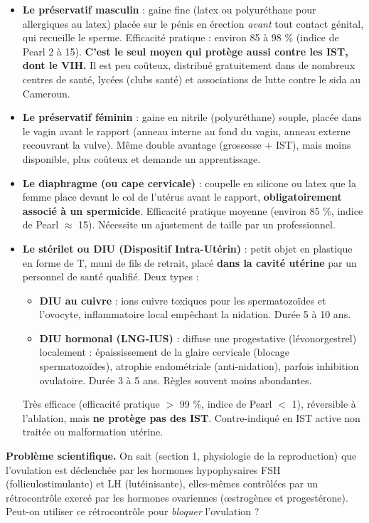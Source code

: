\documentclass[11pt]{article}
\newcommand{\cle}[1]{{\popxbold\color{popdark}#1}}
\newcounter{popsec}
\newcounter{popsub}
\newcommand{\courssub}[1]{%
  \stepcounter{popsub}%
  \par\vspace{9pt}\noindent{\popxbold\fontsize{11.5}{13}\selectfont\color{popink}{\color{poporange}\thepopsec.\thepopsub}\hspace{6pt}#1}\par\nopagebreak\vspace{4pt}
}
\begin{document}
\begin{itemize}
\item \textbf{Le préservatif masculin} : gaine fine (latex ou polyuréthane pour allergiques au latex) placée sur le pénis en érection \emph{avant} tout contact génital, qui recueille le sperme. Efficacité pratique : environ 85 à 98 \% (indice de Pearl 2 à 15). \textbf{C'est le seul moyen qui protège aussi contre les IST, dont le VIH.} Il est peu coûteux, distribué gratuitement dans de nombreux centres de santé, lycées (clubs santé) et associations de lutte contre le sida au Cameroun.
\item \textbf{Le préservatif féminin} : gaine en nitrile (polyuréthane) souple, placée dans le vagin avant le rapport (anneau interne au fond du vagin, anneau externe recouvrant la vulve). Même double avantage (grossesse + IST), mais moins disponible, plus coûteux et demande un apprentissage.
\item \textbf{Le diaphragme (ou cape cervicale)} : coupelle en silicone ou latex que la femme place devant le col de l'utérus avant le rapport, \textbf{obligatoirement associé à un spermicide}. Efficacité pratique moyenne (environ 85 \%, indice de Pearl $\approx$ 15). Nécessite un ajustement de taille par un professionnel.
\item \textbf{Le stérilet ou DIU (Dispositif Intra-Utérin)} : petit objet en plastique en forme de T, muni de fils de retrait, placé \textbf{dans la cavité utérine} par un personnel de santé qualifié. Deux types :
  \begin{itemize}
  \item \textbf{DIU au cuivre} : ions cuivre toxiques pour les spermatozoïdes et l'ovocyte, inflammatoire local empêchant la nidation. Durée 5 à 10 ans.
  \item \textbf{DIU hormonal (LNG-IUS)} : diffuse une progestative (lévonorgestrel) localement : épaississement de la glaire cervicale (blocage spermatozoïdes), atrophie endométriale (anti-nidation), parfois inhibition ovulatoire. Durée 3 à 5 ans. Règles souvent moins abondantes.
  \end{itemize}
  Très efficace (efficacité pratique $>$ 99 \%, indice de Pearl $<$ 1), réversible à l'ablation, mais \textbf{ne protège pas des IST}. Contre-indiqué en IST active non traitée ou malformation utérine.
\end{itemize}

\courssub{Les méthodes hormonales}

\textbf{Problème scientifique.} On sait (section 1, physiologie de la reproduction) que l'ovulation est déclenchée par les hormones hypophysaires \cle{FSH} (folliculostimulante) et \cle{LH} (lutéinisante), elles-mêmes contrôlées par un rétrocontrôle exercé par les hormones ovariennes (œstrogènes et progestérone). Peut-on utiliser ce rétrocontrôle pour \emph{bloquer} l'ovulation ?
\end{document}
